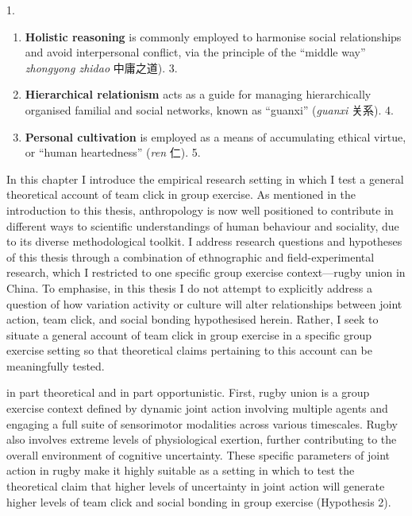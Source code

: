 \begin{CJK}{UTF8}{gbsn}
    1. \begin{enumerate}
    2.   \item \textbf{Holistic reasoning} is commonly employed to harmonise social relationships and avoid interpersonal conflict, via the principle of the  ``middle way'' \textit{zhongyong zhidao} 中庸之道).
    3.   \item \textbf{Hierarchical relationism} acts as a guide for managing hierarchically organised familial and social networks, known as ``guanxi'' (\textit{guanxi} 关系).
    4.   \item \textbf{Personal cultivation} is employed as a means of accumulating ethical virtue, or ``human heartedness'' (\textit{ren} 仁).
    5. \end{enumerate}



















In this chapter I introduce the empirical research setting in which I test a general theoretical account of team click in group exercise.  As mentioned in the introduction to this thesis, anthropology is now well positioned to contribute in different ways to scientific understandings of human behaviour and sociality, due to its diverse methodological toolkit.  I address research questions and hypotheses of this thesis through a combination of ethnographic and field-experimental research, which I restricted to one specific group exercise context—rugby union in China.  To emphasise, in this thesis I do not attempt to explicitly address a question of how variation activity or culture will alter relationships between joint action, team click, and social bonding hypothesised herein.  Rather, I seek to situate a general account of team click in group exercise in a specific group exercise setting so that theoretical claims pertaining to this account can be meaningfully tested.

 in part theoretical and in part opportunistic.  First, rugby union is a group exercise context defined by dynamic joint action involving multiple agents and engaging a full suite of sensorimotor modalities across various timescales.  Rugby also involves extreme levels of physiological exertion, further contributing to the overall environment of cognitive uncertainty.  These specific parameters of joint action in rugby make it highly suitable as a setting in which to test the theoretical claim that higher levels of uncertainty in joint action will generate higher levels of team click and social bonding in group exercise (Hypothesis 2).


\end{CJK}
